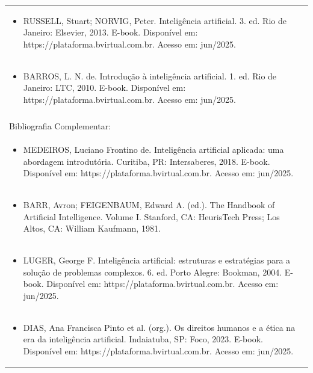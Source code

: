 \documentclass[11pt]{article}
\begin{document}
\begin{center}
\begin{longtable}{|p{4cm}|p{4cm}|p{4cm}|p{4cm}|}
\multicolumn{4}{|p{\dimexpr 16cm + 6\tabcolsep\relax}|}{\begin{itemize}\item RUSSELL, Stuart; NORVIG, Peter. Inteligência artificial. 3. ed. Rio de Janeiro: Elsevier, 2013. E-book. Disponível em: https://plataforma.bvirtual.com.br. Acesso em: jun/2025.\end{itemize}}\\
\multicolumn{4}{|p{\dimexpr 16cm + 6\tabcolsep\relax}|}{\begin{itemize}\item BARROS, L. N. de. Introdução à inteligência artificial. 1. ed. Rio de Janeiro: LTC, 2010. E-book. Disponível em: https://plataforma.bvirtual.com.br. Acesso em: jun/2025.\end{itemize}}\\
\multicolumn{4}{|p{16cm}|}{}\\
\hline
\multicolumn{4}{|p{16cm}|}{Bibliografia Complementar:}\\*
\multicolumn{4}{|p{\dimexpr 16cm + 6\tabcolsep\relax}|}{\begin{itemize}\item MEDEIROS, Luciano Frontino de. Inteligência artificial aplicada: uma abordagem introdutória. Curitiba, PR: Intersaberes, 2018. E-book. Disponível em: https://plataforma.bvirtual.com.br. Acesso em: jun/2025.\end{itemize}}\\
\multicolumn{4}{|p{\dimexpr 16cm + 6\tabcolsep\relax}|}{\begin{itemize}\item BARR, Avron; FEIGENBAUM, Edward A. (ed.). The Handbook of Artificial Intelligence. Volume I. Stanford, CA: HeurisTech Press; Los Altos, CA: William Kaufmann, 1981.\end{itemize}}\\
\multicolumn{4}{|p{\dimexpr 16cm + 6\tabcolsep\relax}|}{\begin{itemize}\item LUGER, George F. Inteligência artificial: estruturas e estratégias para a solução de problemas complexos. 6. ed. Porto Alegre: Bookman, 2004. E-book. Disponível em: https://plataforma.bvirtual.com.br. Acesso em: jun/2025.\end{itemize}}\\
\multicolumn{4}{|p{\dimexpr 16cm + 6\tabcolsep\relax}|}{\begin{itemize}\item DIAS, Ana Francisca Pinto et al. (org.). Os direitos humanos e a ética na era da inteligência artificial. Indaiatuba, SP: Foco, 2023. E-book. Disponível em: https://plataforma.bvirtual.com.br. Acesso em: jun/2025.\end{itemize}}\\

\end{longtable}
\end{center}
\end{document}
